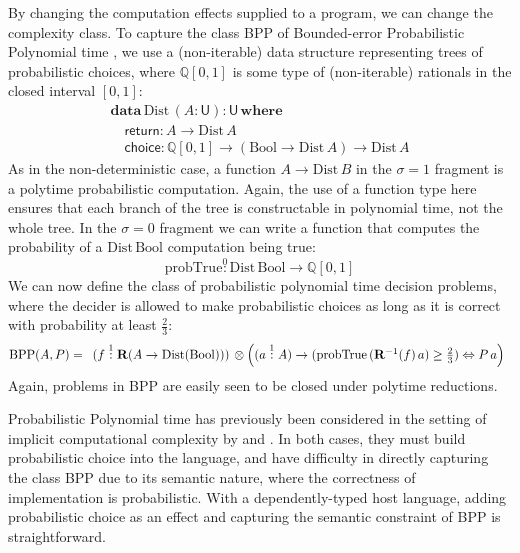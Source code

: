 \documentclass[acmsmall,screen]{acmart}
\newcommand{\BoolTy}{\mathrm{Bool}}
\begin{document}
By changing the computation effects supplied to a program, we can
change the complexity class. To capture the class BPP of Bounded-error
Probabilistic Polynomial time \cite{AroraBarak09}, we use a
(non-iterable) data structure representing trees of probabilistic
choices, where $\mathbb{Q}[0,1]$ is some type of (non-iterable)
rationals in the closed interval $[0,1]$:
\begin{displaymath}
  \begin{array}{l}
    \textbf{data}\,\mathrm{Dist}\,(A : \mathsf{U}) : \mathsf{U}\,\textbf{where} \\
    \quad \mathsf{return} : A \to \mathrm{Dist}\,A \\
    \quad \mathsf{choice} : \mathbb{Q}[0,1] \to (\BoolTy \to \mathrm{Dist}\,A) \to \mathrm{Dist}\,A
  \end{array}
\end{displaymath}
As in the non-deterministic case, a function $A \to \mathrm{Dist}\,B$
in the $\sigma = 1$ fragment is a polytime probabilistic
computation. Again, the use of a function type here ensures that each
branch of the tree is constructable in polynomial time, not the whole
tree. In the $\sigma = 0$ fragment we can write a function that
computes the probability of a $\mathrm{Dist}\,\BoolTy$ computation
being true:
\begin{displaymath}
  \mathrm{probTrue} \stackrel0: \mathrm{Dist}\,\BoolTy \to \mathbb{Q}[0,1]
\end{displaymath}
We can now define the class of probabilistic polynomial time decision
problems, where the decider is allowed to make probabilistic choices
as long as it is correct with probability at least $\frac{2}{3}$:
\begin{displaymath}
  \mathrm{BPP}(A,P) =
  \begin{array}[t]{l}
    (f \stackrel1: \mathbf{R}(A \to \mathrm{Dist}(\BoolTy))) \, \otimes
    \left((a \stackrel1: A) \to (\mathrm{probTrue}\,(\mathbf{R}^{-1}(f)\,a) \geq \frac{2}{3}) \Leftrightarrow P\,a\right)
  \end{array}
\end{displaymath}
Again, problems in BPP are easily seen to be closed under polytime
reductions.

Probabilistic Polynomial time has previously been considered in the
setting of implicit computational complexity by
\citet{dallago_et_al:LIPIcs.MFCS.2021.35} and \citet{LagoT15}. In both
cases, they must build probabilistic choice into the language, and
have difficulty in directly capturing the class BPP due to its
semantic nature, where the correctness of implementation is
probabilistic. With a dependently-typed host language, adding
probabilistic choice as an effect and capturing the semantic
constraint of BPP is straightforward.
\end{document}
